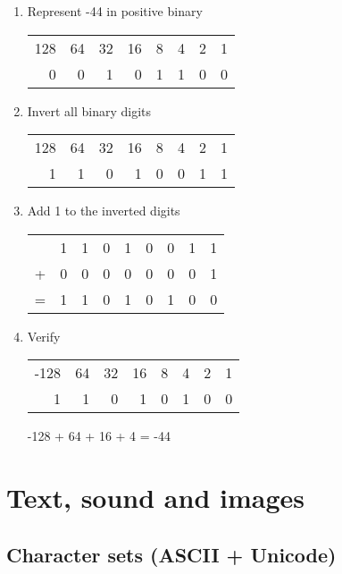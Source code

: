 \documentclass[11pt]{article}
\begin{document}
\begin{enumerate}
\begin{enumerate}
\item Represent -44 in positive binary
\begin{center}
\begin{tabular}{rrrrrrrr}
128 & 64 & 32 & 16 & 8 & 4 & 2 & 1\\
0 & 0 & 1 & 0 & 1 & 1 & 0 & 0\\
\end{tabular}
\end{center}
\item Invert all binary digits
\begin{center}
\begin{tabular}{rrrrrrrr}
128 & 64 & 32 & 16 & 8 & 4 & 2 & 1\\
1 & 1 & 0 & 1 & 0 & 0 & 1 & 1\\
\end{tabular}
\end{center}
\item Add 1 to the inverted digits
\begin{center}
\begin{tabular}{lrrrrrrrr}
 & 1 & 1 & 0 & 1 & 0 & 0 & 1 & 1\\
+ & 0 & 0 & 0 & 0 & 0 & 0 & 0 & 1\\
= & 1 & 1 & 0 & 1 & 0 & 1 & 0 & 0\\
\end{tabular}
\end{center}
\item Verify
\begin{center}
\begin{tabular}{rrrrrrrr}
-128 & 64 & 32 & 16 & 8 & 4 & 2 & 1\\
1 & 1 & 0 & 1 & 0 & 1 & 0 & 0\\
\end{tabular}
\end{center}
-128 + 64 + 16 + 4 = -44
\end{enumerate}
\end{enumerate}
\section{Text, sound and images}
\label{sec:org158a3dd}
\subsection{Character sets (ASCII + Unicode)}
\label{sec:orgb697801}
\end{document}
